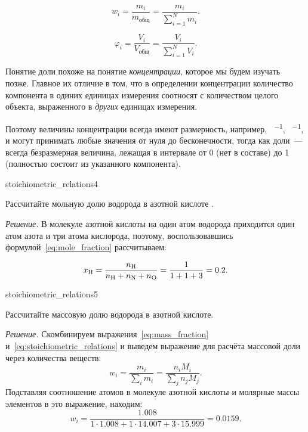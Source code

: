 \begin{equation}
    \label{eq:mass_fraction}
    \boxed{w_i = \frac{m_i}{m_{\text{общ}}} = \frac{m_i}{\sum_{i = 1}^{N} m_i}}.
\end{equation}

\begin{equation}
    \label{eq:volume_fraction}
    \boxed{{\varphi }_i = \frac{V_i}{V_{\text{общ}}} = \frac{V_i}{\sum_{i = 1}^{N} V_i}}.
\end{equation}

Понятие доли похоже на понятие \emph{концентрации}, которое мы будем изучать позже. Главное их отличие в том, что в определении концентрации количество компонента в одиних единицах измерения соотносят с количеством целого объекта, выраженного в \emph{других} единицах измерения.

Поэтому величины концентрации всегда имеют размерность, например, \unit{\ruG\per\ruL}, \unit{\ruMole\per\ruL}, и могут принимать любые значения от нуля до бесконечности, тогда как доли~--- всегда безразмерная величина, лежащая в интервале от 0 (нет в составе) до 1 (полностью состоит из указанного компонента).

\begin{example}{}{stoichiometric_relations4}
    \begin{condition}
        Рассчитайте мольную долю водорода в азотной кислоте .
    \end{condition}

    \medskip

    \textit{Решение.} В молекуле азотной кислоты на один атом водорода приходится один атом азота и три атома кислорода, поэтому, воспользовавшись формулой~\eqref{eq:mole_fraction} рассчитываем:

    \begin{equation*}
        x_{\ce{H}} = \frac{n_{\ce{H}}}{n_{\ce{H}} + n_{\ce{N}} + n_{\ce{O}}} = \frac{1}{1 + 1 + 3} = \num{0,2}.
    \end{equation*}
\end{example}

\begin{example}{}{stoichiometric_relations5}
    \begin{condition}
        Рассчитайте массовую долю водорода в азотной кислоте.
    \end{condition}

    \medskip

    \textit{Решение.} Скомбинируем выражения~\eqref{eq:mass_fraction} и~\eqref{eq:stoichiometric_relations} и выведем выражение для расчёта массовой доли через количества веществ:
    \begin{equation*}
        w_i  = \frac{m_i}{\sum_{i}^{} m_i} = \frac{n_iM_i}{\sum_{j}^{}n_jM_j}.
    \end{equation*}
    Подставляя соотношение атомов в молекуле азотной кислоты и молярные массы элементов в это выражение, находим:
    \begin{equation*}
        w_i  = \frac{\num{1,008}}{1 \cdot \num{1,008} + 1 \cdot \num{14,007} + 3 \cdot \num{15,999}} = \num{0,0159}.
    \end{equation*}
\end{example}

